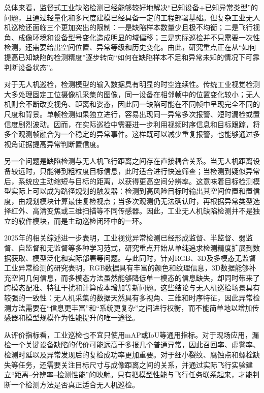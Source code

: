 总体来看，监督式工业缺陷检测已经能够较好地解决“已知设备+已知异常类型”的问题，且通过轻量化和多尺度建模已经具备一定的工程部署基础。但复杂工业无人机巡检还面临三个更加突出的限制：一是缺陷样本数量少且极不均衡；二是飞行视角、成像环境和设备型号变化造成明显的域偏移；三是实际巡检并不只需要一次性检测，还需要给出空间位置、异常等级和历史变化。由此，研究重点正在从“如何提高已知缺陷的检测精度”逐步转向“如何在缺陷样本不足和异常未知的情况下可靠判断设备状态”。



对于无人机巡检，检测模型的输入数据具有明显的时空连续性。传统工业视觉检测大多处理固定工位摄像机采集的图像，同一设备在相邻帧中的位置变化较小；无人机则会不断改变视角、距离和姿态，因此同一缺陷可能在不同帧中呈现完全不同的尺度和背景。单帧检测如果独立进行，容易出现同一异常多次报警、短时漏检或置信度剧烈波动。因而，在实际巡检中需要进一步利用视频时序信息和目标跟踪，将多个观测帧融合为一个稳定的异常事件。这样既可以减少重复报警，也能够通过多视角证据提高异常判断置信度。

另一个问题是缺陷检测与无人机飞行距离之间存在直接耦合关系。当无人机距离设备较远时，只能得到粗粒度目标信息，此时适合进行快速筛查；当检测到疑似异常后，系统应主动缩短与目标的距离，以获得更高空间分辨率。这意味着目标检测模型实际上可以成为路径规划的触发器：检测到高风险目标时输出其空间位置和置信度，由规划模块计算最佳复检视点；当多次观测仍无法确认时，再根据异常类型选择红外、高清变焦或三维扫描等不同传感器。因此，工业无人机缺陷检测并不是独立的软件模块，而是主动巡检闭环中的一环。

2025年的相关综述进一步表明，工业视觉异常检测已经形成监督、半监督、弱监督、自监督和无监督等多种学习范式，研究重点开始从单纯追求检测精度扩展到数据获取、模型泛化和实际部署等问题\cite{li2025iad}。与此同时，针对RGB、3D及多模态无监督工业异常检测的研究表明，RGB数据具有丰富的颜色和纹理信息，3D数据能够补充空间几何信息，而多模态方法虽然能够降低单一模态的信息缺失，却同时带来了跨模态配准、特征干扰和计算成本增加等新问题\cite{lin2025rgb3dmm}。这些结论与无人机巡检场景具有较强的一致性：无人机采集的数据天然具有多视角、三维和时序特征，因此异常检测方法需要在“信息更丰富”和“系统更复杂”之间进行权衡，而不能简单地以增加传感器和模型规模作为性能提升的唯一途径。

从评价指标看，工业巡检也不宜只使用mAP或IoU等通用指标。对于现场应用，漏检一个关键设备缺陷的代价可能远高于多报几个普通异常，因此召回率、虚警率、检测时延以及异常发现后的复检成功率更加重要。对于细小裂纹、腐蚀点和螺栓缺失等任务，还需要关注目标尺寸与成像距离之间的关系，并通过实际飞行实验建立“距离--分辨率--检测性能”的映射。只有把模型性能与飞行任务联系起来，才能判断一个检测方法是否真正适合无人机巡检。

